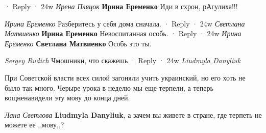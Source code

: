\begin{itemize}
\begin{itemize}
 · Reply · 24w
\emph{Ирена Пляцок}
\textbf{Ирина Еременко} Иди в схрон, рАгулиха!!!

\emph{Ирина Еременко}
Разберитесь у себя дома сначала.
 · Reply · 24w
\emph{Светлана Матвиенко}
\textbf{Ирина Еременко} Невоспитанная особь.
 · Reply · 24w
\emph{Ирина Еременко}
\textbf{Светлана Матвиенко} Особь это ты.

\end{itemize}

\emph{Sergey Rudich}
Чмошники, что скажешь
 · Reply · 24w
\emph{Liudmyla Danyliuk}

При Советской власти всех силой загоняли учить украинский, но его хоть не было
так много. Черыре урока в неделю мы еще терпели, а теперь вощненавидели эту
мову до конца дней.

\begin{itemize}
\emph{Лана Светлова}
\textbf{Liudmyla Danyliuk}, а зачем вы живете в стране, где терпеть не можете ее ,,мову,,?
\end{itemize}

\end{itemize}
